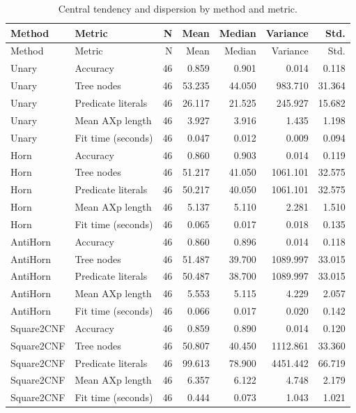 \begingroup
\small
\setlength{\tabcolsep}{3pt}
\begin{longtable}{llrrrrr}
\caption{Central tendency and dispersion by method and metric.}\label{tab:descriptive-statistics-central}\\
\toprule
Method & Metric & N & Mean & Median & Variance & Std. \\
\midrule
\endfirsthead
\toprule
Method & Metric & N & Mean & Median & Variance & Std. \\
\midrule
\endhead
Unary & Accuracy & 46 & 0.859 & 0.901 & 0.014 & 0.118 \\
Unary & Tree nodes & 46 & 53.235 & 44.050 & 983.710 & 31.364 \\
Unary & Predicate literals & 46 & 26.117 & 21.525 & 245.927 & 15.682 \\
Unary & Mean AXp length & 46 & 3.927 & 3.916 & 1.435 & 1.198 \\
Unary & Fit time (seconds) & 46 & 0.047 & 0.012 & 0.009 & 0.094 \\
Horn & Accuracy & 46 & 0.860 & 0.903 & 0.014 & 0.119 \\
Horn & Tree nodes & 46 & 51.217 & 41.050 & 1061.101 & 32.575 \\
Horn & Predicate literals & 46 & 50.217 & 40.050 & 1061.101 & 32.575 \\
Horn & Mean AXp length & 46 & 5.137 & 5.110 & 2.281 & 1.510 \\
Horn & Fit time (seconds) & 46 & 0.065 & 0.017 & 0.018 & 0.135 \\
AntiHorn & Accuracy & 46 & 0.860 & 0.896 & 0.014 & 0.118 \\
AntiHorn & Tree nodes & 46 & 51.487 & 39.700 & 1089.997 & 33.015 \\
AntiHorn & Predicate literals & 46 & 50.487 & 38.700 & 1089.997 & 33.015 \\
AntiHorn & Mean AXp length & 46 & 5.553 & 5.115 & 4.229 & 2.057 \\
AntiHorn & Fit time (seconds) & 46 & 0.066 & 0.017 & 0.020 & 0.142 \\
Square2CNF & Accuracy & 46 & 0.859 & 0.890 & 0.014 & 0.120 \\
Square2CNF & Tree nodes & 46 & 50.807 & 40.450 & 1112.861 & 33.360 \\
Square2CNF & Predicate literals & 46 & 99.613 & 78.900 & 4451.442 & 66.719 \\
Square2CNF & Mean AXp length & 46 & 6.357 & 6.122 & 4.748 & 2.179 \\
Square2CNF & Fit time (seconds) & 46 & 0.444 & 0.073 & 1.043 & 1.021 \\

\end{longtable}
